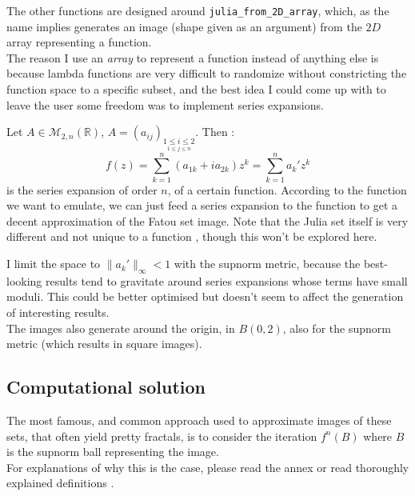 \documentclass{article}
\newcommand\R{\mathbb{R}}
\begin{document}
The other functions are designed around \texttt{julia\_from\_2D\_array}, which, as the name implies generates an image (shape given as an argument) from the $2D$ array representing a function. \\
The reason I use an \textit{array} to represent a function instead of anything else is because lambda functions are very difficult to randomize without constricting the function space to a specific subset, and the best idea I could come up with to leave the user some freedom was to implement series expansions. \\
\vspace{5mm}

Let $A \in \mathcal{M}_{2,n}(\R)$, $A = (a_{ij})_{\underset{1 \leq j \leq n}{1 \leq i \leq 2}}$. Then : \\
$$f(z) = \sum_{k=1}^n{(a_{1k}+i a_{2k})z^k} = \sum_{k=1}^n{a_k'z^k}$$
is the series expansion of order $n$, of a certain function. According to the function we want to emulate, we can just feed a series expansion to the function to get a decent approximation of the Fatou set image. Note that the Julia set itself is very different and not unique to a function \cite{Lev97}, though this won't be explored here. \\
\vspace{5mm}

I limit the space to $\lVert a_k' \rVert_{\infty} < 1$ with the supnorm metric, because the best-looking results tend to gravitate around series expansions whose terms have small moduli. This could be better optimised but doesn't seem to affect the generation of interesting results. \\
\vspace{2mm}
The images also generate around the origin, in $B(0,2)$, also for the supnorm metric (which results in square images). \\
\vspace{5mm}

\subsection{Computational solution}

The most famous, and common approach used to approximate images of these sets, that often yield pretty fractals, is to consider the iteration $f^n(B)$ where $B$ is the supnorm ball representing the image. \\
For explanations of why this is the case, please read the annex or read thoroughly explained definitions \cite{Sut14}. \\
\vspace{5mm}
\end{document}
